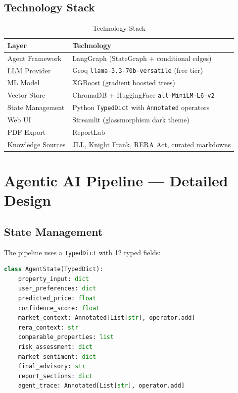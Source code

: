 \documentclass[12pt,a4paper]{article}
\begin{document}
\subsection{Technology Stack}
\begin{table}[H]\centering
\caption{Technology Stack}
\begin{tabular}{@{}ll@{}}
\toprule
\textbf{Layer} & \textbf{Technology} \\
\midrule
Agent Framework & LangGraph (StateGraph + conditional edges) \\
LLM Provider & Groq \texttt{llama-3.3-70b-versatile} (free tier) \\
ML Model & XGBoost (gradient boosted trees) \\
Vector Store & ChromaDB + HuggingFace \texttt{all-MiniLM-L6-v2} \\
State Management & Python \texttt{TypedDict} with \texttt{Annotated} operators \\
Web UI & Streamlit (glassmorphism dark theme) \\
PDF Export & ReportLab \\
Knowledge Sources & JLL, Knight Frank, RERA Act, curated markdowns \\
\bottomrule
\end{tabular}
\end{table}

\section{Agentic AI Pipeline — Detailed Design}

\subsection{State Management}
The pipeline uses a \texttt{TypedDict} with 12 typed fields:

\begin{lstlisting}[language=Python, basicstyle=\ttfamily\small, frame=single, breaklines=true]
class AgentState(TypedDict):
    property_input: dict
    user_preferences: dict
    predicted_price: float
    confidence_score: float
    market_context: Annotated[List[str], operator.add]
    rera_context: str
    comparable_properties: list
    risk_assessment: dict
    market_sentiment: dict
    final_advisory: str
    report_sections: dict
    agent_trace: Annotated[List[str], operator.add]
\end{lstlisting}
\end{document}
